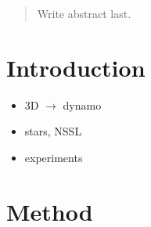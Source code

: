 \documentclass[aps,prl, reprint,superscriptaddress]{revtex4-1}
\begin{document}
\begin{abstract}
Write abstract last.
\end{abstract}

\pacs{}

\maketitle


\section{Introduction}
\label{sec:intro}

\begin{itemize}
\item 3D $\to$ dynamo
\item stars, NSSL
\item experiments
\end{itemize}

\section{Method}
\label{sec:method}
\end{document}
